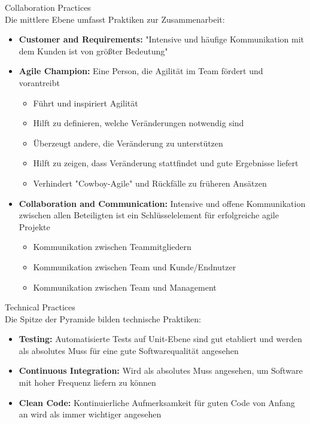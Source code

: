 \begin{concept}{Collaboration Practices}\\
    Die mittlere Ebene umfasst Praktiken zur Zusammenarbeit:
    \begin{itemize}
        \item \textbf{Customer and Requirements:} "Intensive und häufige Kommunikation mit dem Kunden ist von größter Bedeutung"
        
        \item \textbf{Agile Champion:} Eine Person, die Agilität im Team fördert und vorantreibt
        \begin{itemize}
            \item Führt und inspiriert Agilität
            \item Hilft zu definieren, welche Veränderungen notwendig sind
            \item Überzeugt andere, die Veränderung zu unterstützen
            \item Hilft zu zeigen, dass Veränderung stattfindet und gute Ergebnisse liefert
            \item Verhindert "Cowboy-Agile" und Rückfälle zu früheren Ansätzen
        \end{itemize}
        
        \item \textbf{Collaboration and Communication:} Intensive und offene Kommunikation zwischen allen Beteiligten ist ein Schlüsselelement für erfolgreiche agile Projekte
        \begin{itemize}
            \item Kommunikation zwischen Teammitgliedern
            \item Kommunikation zwischen Team und Kunde/Endnutzer
            \item Kommunikation zwischen Team und Management
        \end{itemize}
    \end{itemize}
\end{concept}

\begin{concept}{Technical Practices}\\
    Die Spitze der Pyramide bilden technische Praktiken:
    \begin{itemize}
        \item \textbf{Testing:} Automatisierte Tests auf Unit-Ebene sind gut etabliert und werden als absolutes Muss für eine gute Softwarequalität angesehen
        
        \item \textbf{Continuous Integration:} Wird als absolutes Muss angesehen, um Software mit hoher Frequenz liefern zu können
        
        \item \textbf{Clean Code:} Kontinuierliche Aufmerksamkeit für guten Code von Anfang an wird als immer wichtiger angesehen
    \end{itemize}
\end{concept}

